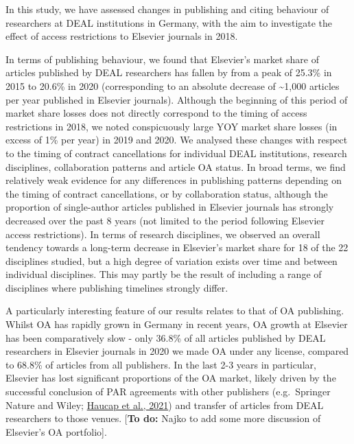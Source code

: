 \documentclass[
]{article}
\begin{document}
In this study, we have assessed changes in publishing and citing behaviour of researchers at DEAL institutions in Germany, with the aim to investigate the effect of access restrictions to Elsevier journals in 2018.

In terms of publishing behaviour, we found that Elsevier's market share of articles published by DEAL researchers has fallen by from a peak of 25.3\% in 2015 to 20.6\% in 2020 (corresponding to an absolute decrease of \textasciitilde1,000 articles per year published in Elsevier journals). Although the beginning of this period of market share losses does not directly correspond to the timing of access restrictions in 2018, we noted conspicuously large YOY market share losses (in excess of 1\% per year) in 2019 and 2020. We analysed these changes with respect to the timing of contract cancellations for individual DEAL institutions, research disciplines, collaboration patterns and article OA status. In broad terms, we find relatively weak evidence for any differences in publishing patterns depending on the timing of contract cancellations, or by collaboration status, although the proportion of single-author articles published in Elsevier journals has strongly decreased over the past 8 years (not limited to the period following Elsevier access restrictions). In terms of research disciplines, we observed an overall tendency towards a long-term decrease in Elsevier's market share for 18 of the 22 disciplines studied, but a high degree of variation exists over time and between individual disciplines. This may partly be the result of including a range of disciplines where publishing timelines strongly differ.

A particularly interesting feature of our results relates to that of OA publishing. Whilst OA has rapidly grown in Germany in recent years, OA growth at Elsevier has been comparatively slow - only 36.8\% of all articles published by DEAL researchers in Elsevier journals in 2020 we made OA under any license, compared to 68.8\% of articles from all publishers. In the last 2-3 years in particular, Elsevier has lost significant proportions of the OA market, likely driven by the successful conclusion of PAR agreements with other publishers (e.g.~Springer Nature and Wiley; \href{https://www.cesifo.org/en/publikationen/2021/working-paper/impact-german-deal-competition-academic-publishing-market}{Haucap et al., 2021}) and transfer of articles from DEAL researchers to those venues. {[}\textbf{To do:} Najko to add some more discussion of Elsevier's OA portfolio{]}.
\end{document}
